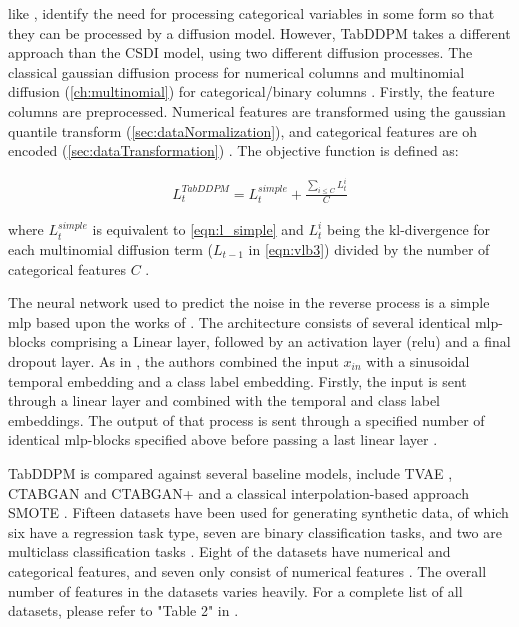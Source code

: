 \cite{kotelnikov2022TabDDPMModellingTabular} like \cite{zheng2022DiffusionModelsMissing}, identify the need for processing categorical variables in some form so that they can be processed by a diffusion model.
However, TabDDPM takes a different approach than the CSDI model, using two different diffusion processes.
The classical gaussian diffusion process \cite{ho2020DenoisingDiffusionProbabilistic} for numerical columns and multinomial diffusion \cite{hoogeboom2021ArgmaxFlowsMultinomial} (\autoref{ch:multinomial}) for categorical/binary columns \cite{zheng2022DiffusionModelsMissing}.
Firstly, the feature columns are preprocessed.
Numerical features are transformed using the gaussian quantile transform (\autoref{sec:dataNormalization}), and categorical features are \gls{oh} encoded (\autoref{sec:dataTransformation}) \cite{kotelnikov2022TabDDPMModellingTabular}.
The objective function is defined as:

\begin{equation}
    \label{eqn:tabddpm_loss}
    \begin{align*}
        L^{TabDDPM}_{t} =L^{simple}_t + \frac{\sum_{i \leq C}^{}L^i_{t}}{C}
    \end{align*}
\end{equation}

where $L^{simple}_t$ is equivalent to \autoref{eqn:l_simple} and $L^i_{t}$ being the \gls{kl}-divergence for each multinomial diffusion term ($L_{t-1}$ in \autoref{eqn:vlb3}) divided by the number of categorical features $C$ \cite{kotelnikov2022TabDDPMModellingTabular}.

The neural network used to predict the noise in the reverse process is a simple \gls{mlp} based upon the works of \cite{gorishniy2021RevisitingDeepLearning}.
The architecture consists of several identical \gls{mlp}-blocks comprising a Linear layer, followed by an activation layer (\gls{relu}) and a final dropout layer. 
As in \cite{nichol2021ImprovedDenoisingDiffusion, dhariwal2021DiffusionModelsBeat}, the authors combined the input $x_{in}$ with a sinusoidal temporal embedding and a class label embedding.
Firstly, the input is sent through a linear layer and combined with the temporal and class label embeddings.
The output of that process is sent through a specified number of identical \gls{mlp}-blocks specified above before passing a last linear layer \cite{kotelnikov2022TabDDPMModellingTabular}.

TabDDPM is compared against several baseline models, include TVAE \cite{xu2019ModelingTabularData}, CTABGAN \cite{zhao2021CTABGANEffectiveTablea} and CTABGAN+ \cite{zhao2022CTABGANEnhancingTabular}
and a classical interpolation-based approach SMOTE \cite{chawla2002SMOTESyntheticMinority}.
Fifteen datasets have been used for generating synthetic data, of which six have a regression task type, seven are binary classification tasks, and two are multiclass classification tasks \cite{kotelnikov2022TabDDPMModellingTabular}.
Eight of the datasets have numerical and categorical features, and seven only consist of numerical features \cite{kotelnikov2022TabDDPMModellingTabular}.
The overall number of features in the datasets varies heavily. 
For a complete list of all datasets, please refer to "Table 2" in \cite[p. 5]{kotelnikov2022TabDDPMModellingTabular}.

